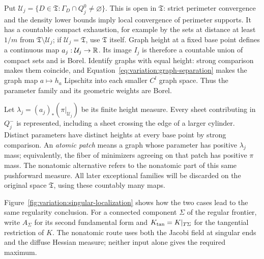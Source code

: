 Put $\mathcal U_j=\{D\in\mathfrak T:\Gamma_D\cap Q_j^0\ne\varnothing\}$.
This is open in $\mathfrak T$: strict perimeter convergence and the
density lower bounds imply local convergence of perimeter supports.
It has a countable compact exhaustion, for example by the sets at
distance at least $1/m$ from $\mathfrak T\setminus\mathcal U_j$;
if $\mathcal U_j=\mathfrak T$, use $\mathfrak T$ itself.
Graph height at a fixed base point defines a continuous map
$a_j:\mathcal U_j\to\mathbb R$. Its image $I_j$ is therefore a countable union
of compact sets and is Borel. Identify graphs with equal height:
strong comparison makes them coincide, and
Equation~\eqref{eq:variation:graph-separation} makes the graph map
$a\mapsto h_a$ Lipschitz into each smaller $C^l$ graph space.
Thus the parameter family and its geometric weights are Borel.

Let $\lambda_j=(a_j)_*(\pi|_{\mathcal U_j})$ be its finite height
measure. Every sheet contributing in $Q_j^-$ is represented, including
a sheet crossing the edge of a larger cylinder. Distinct parameters
have distinct heights at every base point by strong comparison.
An \emph{atomic patch} means a graph whose parameter has positive
$\lambda_j$ mass; equivalently, the fiber of minimizers agreeing on
that patch has positive $\pi$ mass. The nonatomic alternative refers
to the nonatomic part of this same pushforward measure. All later
exceptional families will be discarded on the original space
$\mathfrak T$, using these countably many maps.

Figure~\ref{fig:variation:singular-localization} shows how the two
cases lead to the same regularity conclusion. For a connected component
$\Sigma$ of the regular frontier, write $A_\Sigma$ for its second
fundamental form and $K_{\rm tan}=K|_{T\Sigma}$ for the tangential
restriction of $K$. The nonatomic route
uses both the Jacobi field at singular ends and the diffuse Hessian
measure; neither input alone gives the required maximum.

